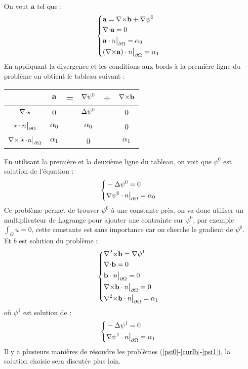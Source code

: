 On veut $\mathbf{a}$ tel que :
\begin{equation}
\label{a}
\left\{
\begin{aligned}
&\mathbf{a}={\nabla\times} \mathbf{b}+{\nabla}\psi^0\\
&{\nabla\cdot} \mathbf{a} =0\\
&\mathbf{a}\cdot n{\big\rvert_{\partial\Omega}} = \alpha_0\\
&({\nabla\times} \mathbf{a})\cdot n{\big\rvert_{\partial\Omega}} = \alpha_1
\end{aligned}
\right.
\end{equation}
En appliquant la divergence et les conditions aux bords à la première ligne du problème on obtient le tableau suivant :
\begin{center}
\begin{tabular}{c|ccccc}
& $\mathbf{a}$ & = & ${\nabla}\psi^0$ & + & ${\nabla\times} \mathbf{b}$ \\ \hline
${\nabla\cdot}\star$ & 0 & & ${\Delta}\psi^0$ & & 0\\ \hline
$\star\cdot n{\big\rvert_{\partial\Omega}}$ & $\alpha_0$ & & $\alpha_0$ & & 0\\ \hline
${\nabla\times}\star\cdot n{\big\rvert_{\partial\Omega}}$ & $\alpha_1$ & & 0 & & $\alpha_1$
\end{tabular}
\end{center}
En utilisant la première et la deuxième ligne du tableau, on voit que $\psi^0$ est solution de l'équation :
\begin{equation}
\label{psi0}
\left\{
\begin{aligned}
&-{\Delta}\psi^0 = 0\\
&{\nabla}\psi^0\cdot n{\big\rvert_{\partial\Omega}}=\alpha_0
\end{aligned}
\right.
\end{equation}
Ce problème permet de trouver $\psi^0$ à une constante près, on va donc utiliser un multiplicateur de Lagrange pour ajouter une contrainte sur $\psi^0$, par exemple $\int_\Omega u = 0$, cette constante est sans importance car on cherche le gradient de $\psi^0$.\\

Et $b$ est solution du problème :
\begin{equation}
\label{curlb}
\left\{
\begin{aligned}
&{\nabla^2\times} \mathbf{b} = {\nabla}\psi^1\\
&{\nabla\cdot} \mathbf{b} = 0\\
&\mathbf{b}\cdot n{\big\rvert_{\partial\Omega}} = 0\\
&{\nabla\times} \mathbf{b}\cdot n{\big\rvert_{\partial\Omega}} = 0\\
&{\nabla^2\times} \mathbf{b}\cdot n{\big\rvert_{\partial\Omega}} = \alpha_1
\end{aligned}
\right.
\end{equation}
où $\psi^1$ est solution de :
\begin{equation}
\label{psi1}
\left\{
\begin{aligned}
&-{\Delta}\psi^1 = 0\\
&{\nabla}\psi^1\cdot n{\big\rvert_{\partial\Omega}}=\alpha_1
\end{aligned}
\right.
\end{equation}
Il y a plusieurs manières de résoudre les problèmes (\ref{psi0}-\ref{curlb}-\ref{psi1}), la solution choisie sera discutée plus loin.\\

